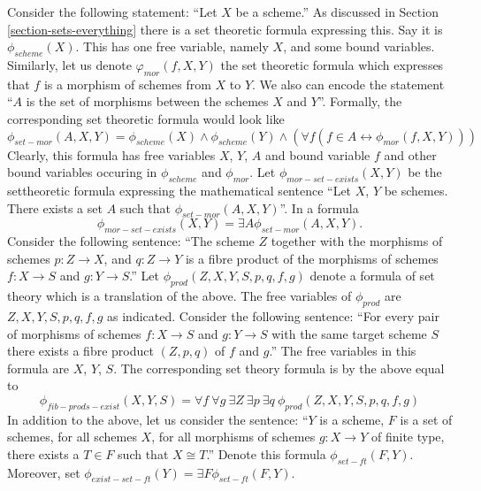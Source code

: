 \medskip\noindent
Consider the following statement: ``Let $X$ be a scheme.''
As discussed in Section \ref{section-sets-everything}
there is a set theoretic formula expressing this.
Say it is $\phi_{scheme}(X)$.
This has one free variable, namely $X$, and some bound variables.
Similarly, let us denote
$\varphi_{mor}(f, X, Y)$ the set theoretic formula
which expresses that $f$ is a morphism of schemes
from $X$ to $Y$. We also can encode the statement
``$A$ is the set of morphisms between the schemes $X$ and $Y$''.
Formally, the corresponding set theoretic formula would look
like
$$
\phi_{set-mor}(A, X, Y) = 
\phi_{scheme}(X) \wedge \phi_{scheme}(Y) \wedge
(\forall f (f \in A \leftrightarrow \phi_{mor}(f, X, Y)))
$$
Clearly, this formula has free variables $X$, $Y$, $A$ and bound variable
$f$ and other bound variables occuring in $\phi_{scheme}$ and
$\phi_{mor}$. Let $\phi_{mor-set-exists}(X, Y)$
be the settheoretic formula expressing the mathematical sentence
``Let $X$, $Y$ be schemes. There exists a set $A$ such that
$\phi_{set-mor}(A, X, Y)$''. In a formula
$$
\phi_{mor-set-exists}(X, Y) = \exists A \phi_{set-mor}(A, X, Y).
$$
Consider the following sentence: ``The scheme $Z$ together
with the morphisms of schemes $p : Z \to X$, and $q : Z \to Y$ is a
fibre product of the morphisms of schemes $f : X \to S$ and
$g : Y \to S$.'' Let $\phi_{prod}(Z, X, Y, S, p, q, f, g)$ denote
a formula of set theory which is a translation of the above.
The free variables of $\phi_{prod}$ are $Z, X, Y, S, p, q, f, g$
as indicated.
Consider the following sentence: ``For every pair of morphisms of
schemes $f : X \to S$ and $g : Y \to S$ with the same target scheme $S$
there exists a fibre product $(Z, p, q)$ of $f$ and $g$.''
The free variables in this formula are $X$, $Y$, $S$.
The corresponding set theory formula is by the above
equal to
$$
\phi_{fib-prods-exist}(X, Y, S)
=
\forall f\ \forall g\ \exists Z\ \exists p\ \exists q\ 
\phi_{prod}(Z, X, Y, S, p, q, f, g)
$$
In addition to the above, let us consider the sentence:
``$Y$ is a scheme, $F$ is a set of schemes, for all schemes $X$,
for all morphisms of schemes $g : X \to Y$ of finite type, there exists a
$T \in F$ such that $X \cong T$.'' Denote this formula
$\phi_{set-ft}(F, Y)$. Moreover, set
$\phi_{exist-set-ft}(Y) = \exists F \phi_{set-ft}(F, Y)$.

